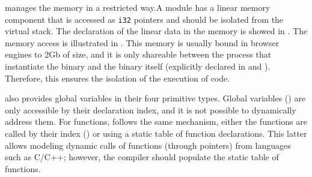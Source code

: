 \begin{code}
    \begin{minipage}[t]{0.4\linewidth}

\end{minipage}\hspace{10mm}
\begin{minipage}[t]{0.4\linewidth}

%

\end{minipage}






\end{code}

manages the memory in a restricted way.A module has a linear memory component that is accessed as \texttt{i32} pointers and should be isolated from the virtual stack. The declaration of the linear data in the memory is showed in . The memory access is illustrated in . This memory is usually bound in browser engines to 2Gb of size, and it is only shareable between the process that instantiate the binary and the binary itself (explicitly declared in  and ). Therefore, this ensures the isolation of the execution of code. 

also provides global variables in their four primitive types. Global variables () are only accessible by their declaration index, and it is not possible to dynamically address them. For functions, follows the same mechanism, either the functions are called by their index () or using a static table of function declarations. This latter allows modeling dynamic calls of functions (through pointers) from languages such as C/C++; however, the compiler should populate the static table of functions.


